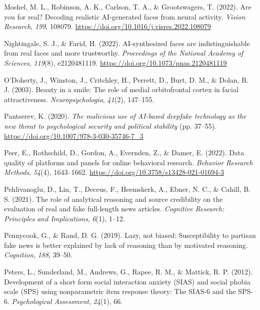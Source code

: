 \documentclass[
  man,floatsintext]{apa6}
\newlength{\cslhangindent}
\newlength{\cslentryspacingunit} %
\newenvironment{CSLReferences}[2] %
 {%
  \setlength{\parindent}{0pt}
  \ifodd #1
  \let\oldpar\par
  \def\par{\hangindent=\cslhangindent\oldpar}
  \fi
  \setlength{\parskip}{#2\cslentryspacingunit}
 }%
 {}
\begin{document}
\begin{CSLReferences}{1}{0}
\leavevmode{}%
Moshel, M. L., Robinson, A. K., Carlson, T. A., \& Grootswagers, T. (2022). Are you for real? Decoding realistic AI-generated faces from neural activity. \emph{Vision Research}, \emph{199}, 108079. \url{https://doi.org/10.1016/j.visres.2022.108079}

\leavevmode{}%
Nightingale, S. J., \& Farid, H. (2022). AI-synthesized faces are indistinguishable from real faces and more trustworthy. \emph{Proceedings of the National Academy of Sciences}, \emph{119}(8), e2120481119. \url{https://doi.org/10.1073/pnas.2120481119}

\leavevmode{}%
O'Doherty, J., Winston, J., Critchley, H., Perrett, D., Burt, D. M., \& Dolan, R. J. (2003). Beauty in a smile: The role of medial orbitofrontal cortex in facial attractiveness. \emph{Neuropsychologia}, \emph{41}(2), 147--155.

\leavevmode{}%
Pantserev, K. (2020). \emph{The malicious use of AI-based deepfake technology as the new threat to psychological security and political stability} (pp. 37--55). \url{https://doi.org/10.1007/978-3-030-35746-7_3}

\leavevmode{}%
Peer, E., Rothschild, D., Gordon, A., Evernden, Z., \& Damer, E. (2022). Data quality of platforms and panels for online behavioral research. \emph{Behavior Research Methods}, \emph{54}(4), 1643--1662. \url{https://doi.org/10.3758/s13428-021-01694-3}

\leavevmode{}%
Pehlivanoglu, D., Lin, T., Deceus, F., Heemskerk, A., Ebner, N. C., \& Cahill, B. S. (2021). The role of analytical reasoning and source credibility on the evaluation of real and fake full-length news articles. \emph{Cognitive Research: Principles and Implications}, \emph{6}(1), 1--12.

\leavevmode{}%
Pennycook, G., \& Rand, D. G. (2019). Lazy, not biased: Susceptibility to partisan fake news is better explained by lack of reasoning than by motivated reasoning. \emph{Cognition}, \emph{188}, 39--50.

\leavevmode{}%
Peters, L., Sunderland, M., Andrews, G., Rapee, R. M., \& Mattick, R. P. (2012). Development of a short form social interaction anxiety (SIAS) and social phobia scale (SPS) using nonparametric item response theory: The SIAS-6 and the SPS-6. \emph{Psychological Assessment}, \emph{24}(1), 66.


\end{CSLReferences}
\end{document}
